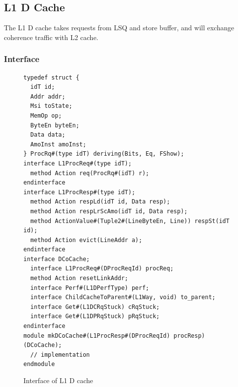 \subsection{L1 D Cache}

The L1 D cache takes requests from LSQ and store buffer, and will exchange coherence traffic with L2 cache.

\subsubsection{Interface}

\begin{figure}
\begin{lstlisting}[caption={}]
typedef struct {
  idT id;
  Addr addr;
  Msi toState;
  MemOp op;
  ByteEn byteEn;
  Data data;
  AmoInst amoInst;
} ProcRq#(type idT) deriving(Bits, Eq, FShow);
interface L1ProcReq#(type idT);
  method Action req(ProcRq#(idT) r);
endinterface
interface L1ProcResp#(type idT);
  method Action respLd(idT id, Data resp);
  method Action respLrScAmo(idT id, Data resp);
  method ActionValue#(Tuple2#(LineByteEn, Line)) respSt(idT id);
  method Action evict(LineAddr a);
endinterface
interface DCoCache;
  interface L1ProcReq#(DProcReqId) procReq;
  method Action resetLinkAddr;
  interface Perf#(L1DPerfType) perf;
  interface ChildCacheToParent#(L1Way, void) to_parent;
  interface Get#(L1DCRqStuck) cRqStuck;
  interface Get#(L1DPRqStuck) pRqStuck;
endinterface
module mkDCoCache#(L1ProcResp#(DProcReqId) procResp)(DCoCache);
  // implementation
endmodule
\end{lstlisting}
\caption{Interface of L1 D cache}\label{fig:d-cache-ifc}
\end{figure}


